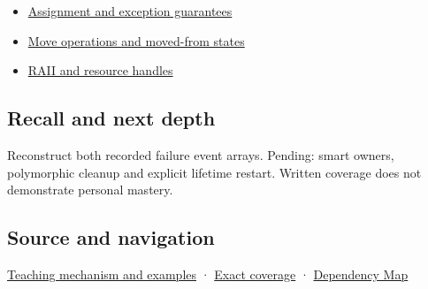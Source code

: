 \begin{itemize}
\tightlist
\item
  \hyperref[appendix-bea6beb5350f]{Assignment and exception guarantees}
\item
  \hyperref[appendix-5636651017c2]{Move operations and moved-from states}
\item
  \hyperref[appendix-69739d3ab49b]{RAII and resource handles}
\end{itemize}

\subsection{Recall and next depth}\label{appendix-9bfe377cef7a-recall-and-next-depth}

Reconstruct both recorded failure event arrays. Pending: smart owners, polymorphic cleanup and explicit lifetime restart. Written coverage does not demonstrate personal mastery.

\subsection{Source and navigation}\label{appendix-9bfe377cef7a-source-and-navigation}

\hyperref[01-foundations-i-ch003-destruction-closes-the-ownership-interval]{Teaching mechanism and examples} · \hyperref[appendix-fd090d982a15-m009---parts-127-147]{Exact coverage} · \hyperref[appendix-4ad47bdd269a]{Dependency Map}
